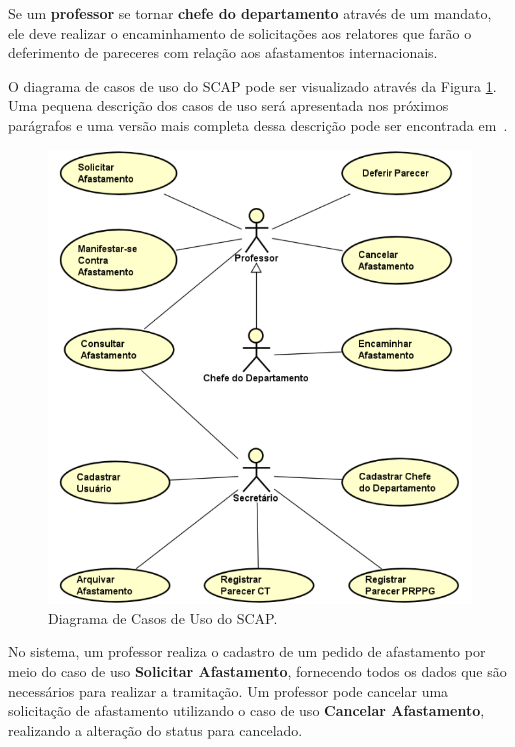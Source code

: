 Se um \textbf{professor} se tornar \textbf{chefe do departamento} através de um mandato, ele deve realizar o encaminhamento de solicitações aos relatores que farão o deferimento de pareceres com relação aos afastamentos internacionais.

O diagrama de casos de uso do SCAP pode ser visualizado através da Figura \ref{fig-requisitos-caso-uso}. Uma pequena descrição dos casos de uso será apresentada nos próximos parágrafos e uma versão mais completa dessa descrição pode ser encontrada em~\cite{duarte-pg14,prado-pg15}.
     
\begin{figure}[h]
	\centering
	\includegraphics[scale=0.5]{figuras/fig-requisitos-caso-uso} 
	\caption{Diagrama de Casos de Uso do SCAP.}
	\label{fig-requisitos-caso-uso}
\end{figure}

No sistema, um professor realiza o cadastro de um pedido de afastamento por meio do caso de uso \textbf{Solicitar Afastamento}, fornecendo todos os dados que são necessários para realizar a tramitação. Um professor pode cancelar uma solicitação de afastamento utilizando o caso de uso \textbf{Cancelar Afastamento}, realizando a alteração do status para cancelado.


